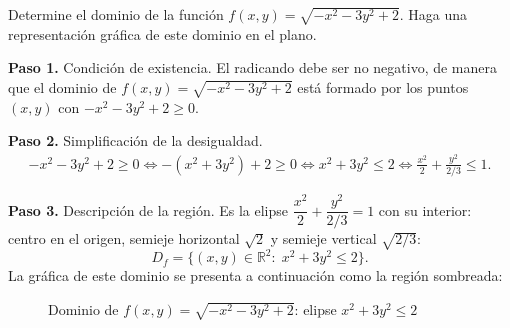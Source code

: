 \begin{prob}
Determine el dominio de la función $f(x,y)=\sqrt{-x^2-3y^2+2}$. Haga una representación gráfica de este dominio en el plano.
\begin{myproof}
\textbf{Paso 1.} Condición de existencia. El radicando debe ser no negativo, de
manera que el dominio de $f(x,y)=\sqrt{-x^2-3y^2+2}$ está formado por los
puntos $(x,y)$ con $-x^2-3y^2+2\geq 0.$

\textbf{Paso 2.} Simplificación de la desigualdad.
\begin{align*}
-x^2-3y^2+2\geq 0 \Leftrightarrow -(x^2+3y^2)+2\geq 0 \Leftrightarrow x^2+3y^2\leq 2
\Leftrightarrow \frac{x^2}{2}+\frac{y^2}{2/3}\leq 1.
\end{align*}

\textbf{Paso 3.} Descripción de la región. Es la elipse
$\dfrac{x^2}{2}+\dfrac{y^2}{2/3}=1$ con su interior: centro en el origen,
semieje horizontal $\sqrt{2}$ y semieje vertical $\sqrt{2/3}$:
\[
  \boxed{D_f=\{(x,y)\in\mathbb{R}^2:\;x^2+3y^2\leq 2\}.}
\]
La gráfica de este dominio se presenta a continuación como la región sombreada:
\begin{figure}[H]
\centering
{}
\caption{Dominio de $f(x,y)=\sqrt{-x^2-3y^2+2}$: elipse $x^2+3y^2\leq 2$}
\label{fig:dom_elipse_x2_3y2}
\end{figure}
\end{myproof}
\end{prob}

